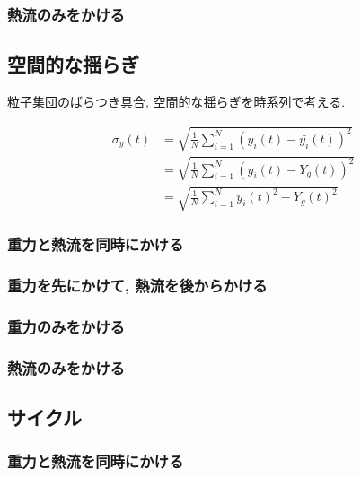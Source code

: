 

\subsubsection{熱流のみをかける}


\subsection{空間的な揺らぎ}

粒子集団のばらつき具合, 空間的な揺らぎを時系列で考える.

\begin{align}
  \sigma_{y} (t)
  &= \sqrt{\frac{1}{N} \sum_{i=1}^{N} (y_i (t) - \bar{y_i}(t) )^2} \\
  &= \sqrt{\frac{1}{N} \sum_{i=1}^{N} (y_i (t) - Y_g (t) )^2} \\
  &= \sqrt{\frac{1}{N} \sum_{i=1}^{N} {{y_i} (t)}^2 - {{Y_g} (t)}^2}
\end{align}

\subsubsection{重力と熱流を同時にかける}



\subsubsection{重力を先にかけて, 熱流を後からかける}



\subsubsection{重力のみをかける}



\subsubsection{熱流のみをかける}


\subsection{サイクル}

\subsubsection{重力と熱流を同時にかける}

